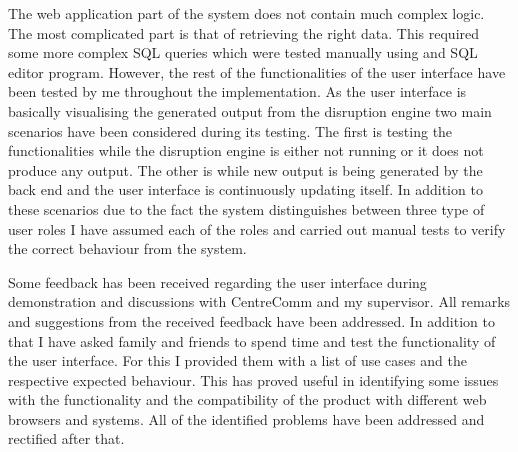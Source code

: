 The web application part of the system does not contain much complex logic. The most complicated part is that of retrieving the right data. This required some more complex SQL queries which were tested manually using and SQL editor program. However, the rest of the functionalities of the user interface have been tested by me throughout the implementation. As the user interface is basically visualising the generated output from the disruption engine two main scenarios have been considered during its testing. The first is testing the functionalities while the disruption engine is either not running or it does not produce any output. The other is while new output is being generated by the back end and the user interface is continuously updating itself. In addition to these scenarios due to the fact the system distinguishes between three type of user roles I have assumed each of the roles and carried out manual tests to verify the correct behaviour from the system. 

Some feedback has been received regarding the user interface during demonstration and discussions with CentreComm and my supervisor. All remarks and suggestions from the received feedback have been addressed. In addition to that I have asked family and friends to spend time and test the functionality of the user interface. For this I provided them with a list of use cases and the respective expected behaviour. This has proved useful in identifying some issues with the functionality and the compatibility of the product with different web browsers and systems. All of the identified problems have been addressed and rectified after that.




